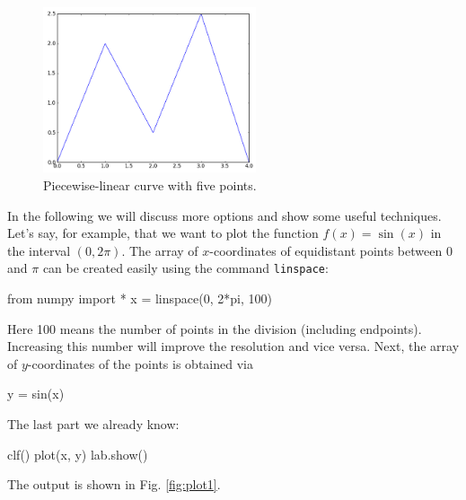 \begin{figure}[!ht]
\begin{center}
\hbox{}
\hspace{-6mm}
\includegraphics[width=0.56\textwidth]{imgp/plot.png}
\end{center}
\vspace{-2mm}
\caption{Piecewise-linear curve with five points.}
\label{fig:plot}
\end{figure}
\noindent
In the following we will discuss more options and show some useful techniques.
Let's say, for example, that we want to plot the function $f(x) = \sin(x)$
in the interval $(0, 2\pi)$. The array of $x$-coordinates of equidistant points 
between 0 and $\pi$ can be created easily using the command {\tt linspace}:

\begin{bluecode}
from numpy import *
x = linspace(0, 2*pi, 100)
\end{bluecode}
Here 100 means the number of points in the division (including endpoints).
Increasing this number will improve the resolution and vice versa. 
Next, the array of $y$-coordinates of the points is obtained via

\begin{bluecode}
y = sin(x)
\end{bluecode}
The last part we already know:

\begin{bluecode}
clf()
plot(x, y)
lab.show()
\end{bluecode}
\noindent
The output is shown in Fig. \ref{fig:plot1}.\\[-7mm]

